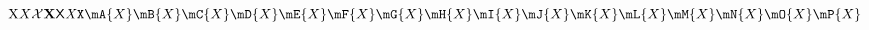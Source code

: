 \documentclass{article}
\begin{document}
$
\mathrm{X}
\mathnormal{X}
\mathcal{X}
\mathbf{X}                                         %
\mathsf{X}                                         %
\mathit{X}                                         %
\mathtt{X}                                         %
\mA{X}                                             %
\mB{X}                                             %
\mC{X}                                             %
\mD{X}                                             %
\mE{X}                                             %
\mF{X}                                             %
\mG{X}                                             %
\mH{X}                                             %
\mI{X}                                             %
\mJ{X}                                             %
\mK{X}                                             %
\mL{X}                                             %
\mM{X}                                             %
\mN{X}                                             %
\mO{X}                                             %
\mP{X}                                             %
$
\end{document}
